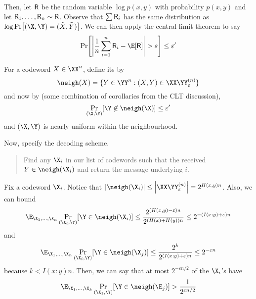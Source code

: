 \documentclass[class=co432,notes,tikz]{agony}
\begin{document}
\begin{prf}
  Then, let $\mathsf R$ be the random variable $\log p(x,y)$ with probability $p(x,y)$
  and let $\mathsf R_1,\dotsc,\mathsf R_n \sim \mathsf R$.
  Observe that $\sum \mathsf R_i$ has the same distribution as $\log \Pr[(\X,\Y)=(\tilde X,\tilde Y)]$.
  We can then apply the central limit theorem to say
  \[ \Pr[\abs{\frac1n\sum_{i=1}^n \rv R_i - \E[\rv R]} > \varepsilon] \leq \varepsilon' \]

  For a codeword $X \in \XX^n$, define its  by
  \[ \neigh(X) = \{Y \in \YY^n : (X,Y) \in \XX\YY_{\varepsilon}^{(n)}\} \]
  and now by (some combination of corollaries from the CLT discussion),
  \[ \Pr_{(\X,\Y)}[\Y \not\in \neigh(\X)] \leq \varepsilon' \]
  and $(\X,\Y)$ is nearly uniform within the neighbourhood.

  Now, specify the decoding scheme.
  \begin{quote}
    Find any $\X_i$ in our list of codewords
    such that the received $Y \in \neigh(\X_i)$
    and return the message underlying $i$.
  \end{quote}
  Fix a codeword $\X_i$.
  Notice that $\abs{\neigh(\X_i)} \leq \abs{\XX\YY_\varepsilon^{(n)}} = 2^{H(x,y)n}$.
  Also, we can bound
  \begin{align*}
    \E_{\X_1,\dotsc,\X_n}\Pr_{(\X_i,\Y)}[\Y \in \neigh(\X_i)] \leq \frac{2^{(H(x,y)-\varepsilon) n}}{2^{(H(x)+H(y))n}} \leq 2^{-(I(x:y)+\varepsilon)n}
  \end{align*}
  and 
  \begin{align*}
    \E_{\X_1,\dotsc,\X_n}\Pr_{(\X_i,\Y)}[\Y \in \neigh(\X_j)] \leq \frac{2^k}{2^{(I(x:y) + \varepsilon)n}} \leq 2^{-\varepsilon n}
  \end{align*}
  because $k < I(x:y) n$. 
  Then, we can say that at most $2^{-\varepsilon n/2}$ of the $\X_i$'s have
  \[
    \E_{\X_1,\dotsc,\X_k} \Pr_{(\X_1,\Y)}[\Y \in \neigh(\E_j)] > \frac{1}{2^{\varepsilon n/2}}
  \]
\end{prf}
\end{document}
